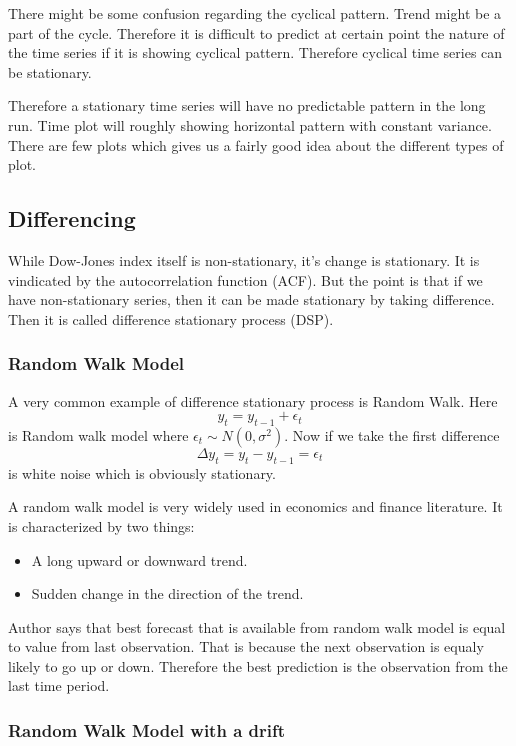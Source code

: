 \documentclass{article}
\begin{document}
There might be some confusion regarding the cyclical pattern. Trend might be a part of the cycle. Therefore it is difficult to predict at certain point the nature of the time series if it is showing cyclical pattern. Therefore cyclical time series can be stationary. 

Therefore a stationary time series will have no predictable pattern in the long run. Time plot will roughly showing horizontal pattern with constant variance. There are few plots which gives us a fairly good idea about the different types of plot. 

\subsection{Differencing}
While Dow-Jones index itself is non-stationary, it's change is stationary. It is vindicated by the autocorrelation function (ACF). But the point is that if we have non-stationary series, then it can be made stationary by taking difference. Then it is called difference stationary process (DSP).

\subsubsection{Random Walk Model}

A very common example of difference stationary process is Random Walk. Here $$ y_t=y_{t-1}+\epsilon_t$$  is Random walk model where $ \epsilon_t \sim N(0, \sigma^2)$. Now if we take the first difference $$\Delta y_t=y_t-y_{t-1}=\epsilon_t$$ is white noise which is obviously stationary. 

A random walk model is very widely used in economics and finance literature. It is characterized by two things:
\begin{itemize}
  \item{A long upward or downward trend.}
  \item{Sudden change in the direction of the trend.}
\end{itemize}

Author says that best forecast that is available from random walk model is equal to value from last observation. That is because the next observation is equaly likely to go up or down. Therefore the best prediction is  the observation from the last time period.

\subsubsection{Random Walk Model with a drift}
\end{document}
